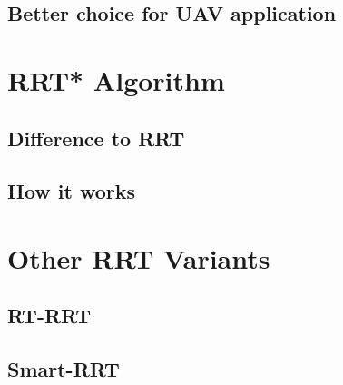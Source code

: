 \subsection{Better choice for UAV application}

\section{RRT* Algorithm}

\subsection{Difference to RRT}

\subsection{How it works}

\section{Other RRT Variants}

\subsection{RT-RRT}

\subsection{Smart-RRT}
